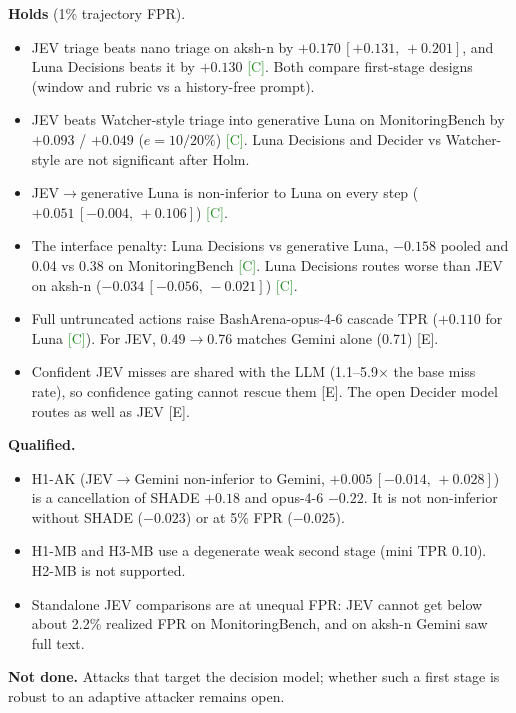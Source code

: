 \documentclass[11pt]{article}
\newcommand{\tC}{\textsf{\scriptsize\textcolor{ForestGreen}{[C]}}\xspace}
\newcommand{\tE}{\textsf{\scriptsize\textcolor{ink2}{[E]}}\xspace}
\newcommand{\ci}[2]{\,[#1,\,#2]}
\begin{document}
\textbf{Holds} (1\% trajectory FPR).
\begin{itemize}
\item JEV triage beats nano triage on aksh-n by $+0.170\ci{+0.131}{+0.201}$, and Luna Decisions beats it by $+0.130$ \tC. Both compare first-stage designs (window and rubric vs a history-free prompt).
\item JEV beats Watcher-style triage into generative Luna on MonitoringBench by $+0.093$ / $+0.049$ ($e=10/20\%$) \tC. Luna Decisions and Decider vs Watcher-style are not significant after Holm.
\item JEV$\to$generative Luna is non-inferior to Luna on every step ($+0.051\ci{-0.004}{+0.106}$) \tC.
\item The interface penalty: Luna Decisions vs generative Luna, $-0.158$ pooled and 0.04 vs 0.38 on MonitoringBench \tC. Luna Decisions routes worse than JEV on aksh-n ($-0.034\ci{-0.056}{-0.021}$) \tC.
\item Full untruncated actions raise BashArena-opus-4-6 cascade TPR ($+0.110$ for Luna \tC). For JEV, 0.49$\to$0.76 matches Gemini alone (0.71) \tE.
\item Confident JEV misses are shared with the LLM (1.1--5.9$\times$ the base miss rate), so confidence gating cannot rescue them \tE. The open Decider model routes as well as JEV \tE.
\end{itemize}
\textbf{Qualified.}
\begin{itemize}
\item H1-AK (JEV$\to$Gemini non-inferior to Gemini, $+0.005\ci{-0.014}{+0.028}$) is a cancellation of SHADE $+0.18$ and opus-4-6 $-0.22$. It is not non-inferior without SHADE ($-0.023$) or at 5\% FPR ($-0.025$).
\item H1-MB and H3-MB use a degenerate weak second stage (mini TPR 0.10). H2-MB is not supported.
\item Standalone JEV comparisons are at unequal FPR: JEV cannot get below about 2.2\% realized FPR on MonitoringBench, and on aksh-n Gemini saw full text.
\end{itemize}
\textbf{Not done.} Attacks that target the decision model; whether such a first stage is robust to an adaptive attacker remains open.
\end{document}

